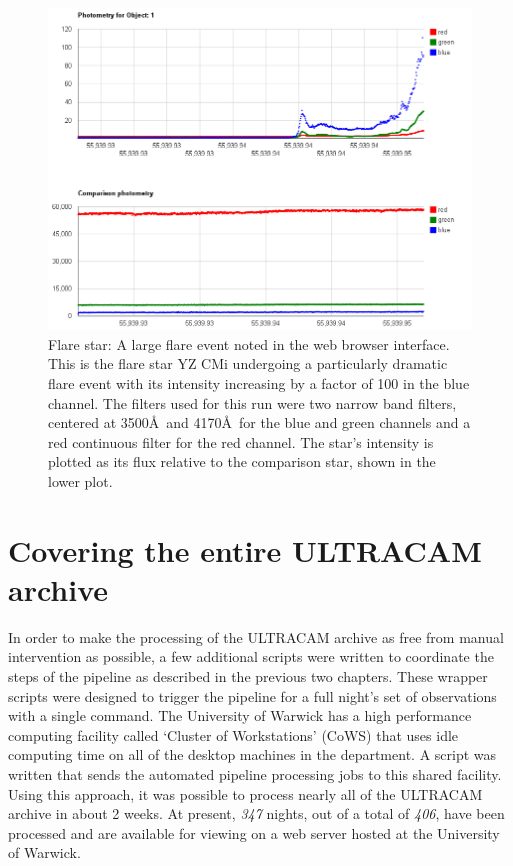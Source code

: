 \begin{figure}
\centering
\includegraphics[width=150mm]{images/ultraflare-on-YZCMi.png}
\caption{Flare star: A large flare event noted in the web browser interface. This is the flare star YZ CMi undergoing a particularly dramatic flare event with its intensity increasing by a factor of 100 in the blue channel. The filters used for this run were two narrow band filters, centered at 3500\AA\  and 4170\AA\  for the blue and green channels and a red continuous filter for the red channel. The star's intensity is plotted as its flux relative to the comparison star, shown in the lower plot. }
\label{fig:ultraflare-web}
\end{figure}


\section{Covering the entire ULTRACAM archive}
In order to make the processing of the ULTRACAM archive as free from manual intervention as possible, a few additional scripts were written to coordinate the steps of the pipeline as described in the previous two chapters. These wrapper scripts were designed to trigger the pipeline for a full night's set of observations with a single command. The University of Warwick has a high performance computing facility called `Cluster of Workstations' (CoWS) that uses idle computing time on all of the desktop machines in the department. A script was written that sends the automated pipeline processing jobs to this shared facility. Using this approach, it was possible to process nearly all of the ULTRACAM archive in about 2 weeks. At present, \emph{347} nights, out of a total of \emph{406}, have been processed and are available for viewing on a web server hosted at the University of Warwick. 

